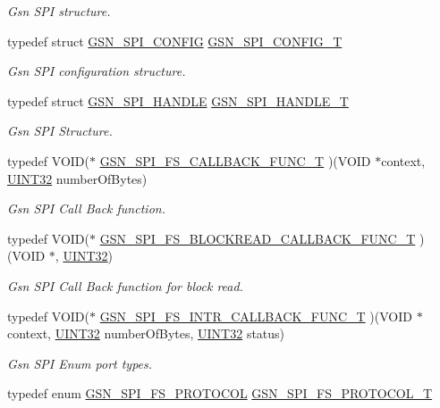 \begin{DoxyCompactItemize}
\begin{DoxyCompactList}\small\item\em Gsn SPI structure. \end{DoxyCompactList}\item 
typedef struct \hyperlink{a00231}{GSN\_\-SPI\_\-CONFIG} \hyperlink{a00655_ga582e2b85ccb404b546fbe5a27f2113cb}{GSN\_\-SPI\_\-CONFIG\_\-T}
\begin{DoxyCompactList}\small\item\em Gsn SPI configuration structure. \end{DoxyCompactList}\item 
typedef struct \hyperlink{a00238}{GSN\_\-SPI\_\-HANDLE} \hyperlink{a00655_ga046c33438e29676344675866f7935308}{GSN\_\-SPI\_\-HANDLE\_\-T}
\begin{DoxyCompactList}\small\item\em Gsn SPI Structure. \end{DoxyCompactList}\item 
typedef VOID($\ast$ \hyperlink{a00655_gaa58c26aaa273da2e8ff41d1833d1147e}{GSN\_\-SPI\_\-FS\_\-CALLBACK\_\-FUNC\_\-T} )(VOID $\ast$context, \hyperlink{a00660_gae1e6edbbc26d6fbc71a90190d0266018}{UINT32} numberOfBytes)
\begin{DoxyCompactList}\small\item\em Gsn SPI Call Back function. \end{DoxyCompactList}\item 
typedef VOID($\ast$ \hyperlink{a00655_ga53ed03a9d5eb404abf8ea4afb4b2ac02}{GSN\_\-SPI\_\-FS\_\-BLOCKREAD\_\-CALLBACK\_\-FUNC\_\-T} )(VOID $\ast$, \hyperlink{a00660_gae1e6edbbc26d6fbc71a90190d0266018}{UINT32})
\begin{DoxyCompactList}\small\item\em Gsn SPI Call Back function for block read. \end{DoxyCompactList}\item 
typedef VOID($\ast$ \hyperlink{a00655_gaccc2e6d52833a5b6d9bbdd2506521d89}{GSN\_\-SPI\_\-FS\_\-INTR\_\-CALLBACK\_\-FUNC\_\-T} )(VOID $\ast$context, \hyperlink{a00660_gae1e6edbbc26d6fbc71a90190d0266018}{UINT32} numberOfBytes, \hyperlink{a00660_gae1e6edbbc26d6fbc71a90190d0266018}{UINT32} status)
\begin{DoxyCompactList}\small\item\em Gsn SPI Enum port types. \end{DoxyCompactList}\item 
typedef enum \hyperlink{a00655_ga1185ce73b403aa52f97a2b0e4146a481}{GSN\_\-SPI\_\-FS\_\-PROTOCOL} \hyperlink{a00655_gaa9b496d91ebb6c1e80cbd1b076c55f40}{GSN\_\-SPI\_\-FS\_\-PROTOCOL\_\-T}

\end{DoxyCompactItemize}
